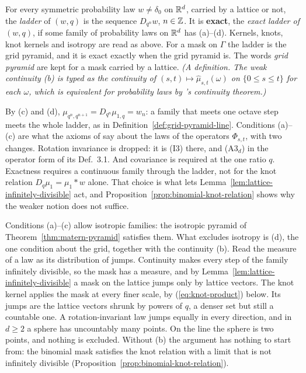 \begin{definition}[exact grid pyramid in $\RR^d$]
For every symmetric probability law $w \ne \delta_0$ on $\RR^d$, carried by a lattice or not, the
\emph{ladder} of $(w, q)$ is the sequence $D_{q^n}w$, $n \in \mathbb{Z}$. It is \textbf{exact}, the
\emph{exact ladder of $(w, q)$}, if some family of probability laws on $\RR^d$ has (a)--(d).
Kernels, knots, knot kernels and isotropy are read as above. For a mask on $\Gamma$ the ladder is
the grid pyramid, and it is exact exactly when the grid pyramid is. The words \emph{grid pyramid}
are kept for a mask carried by a lattice.
\statusT\quad\emph{(A definition. The weak continuity (b) is typed as the continuity of
$(s,t) \mapsto \widehat\mu_{s,t}(\omega)$ on $\{0 \le s \le t\}$ for each $\omega$, which is
equivalent for probability laws by \Levy{}'s continuity theorem.)}
\end{definition}

By (c) and (d), $\mu_{q^n, q^{n+1}} = D_{q^n}\mu_{1,q} = w_n$: a family that meets one octave step
meets the whole ladder, as in Definition~\ref{def:grid-pyramid-line}. Conditions (a)--(c) are what
the axioms of  say about the laws of the operators $\Phi_{s,t}$,
with two changes. Rotation invariance is dropped: it is (I3) there, and (A3$_d$) in the operator
form of its Def.~3.1. And covariance is required at the one ratio $q$. Exactness requires a continuous
family through the ladder, not for the knot relation $D_q\mu_1 = \mu_1 * w$ alone. That choice is
what lets Lemma~\ref{lem:lattice-infinitely-divisible} act, and
Proposition~\ref{prop:binomial-knot-relation} shows why the weaker notion does not suffice.

Conditions (a)--(c) allow isotropic families: the isotropic \Matern{} pyramid of
Theorem~\ref{thm:matern-pyramid} satisfies them. What excludes isotropy is (d), the one condition
about the grid, together with the continuity (b). Read the \Levy{} measure of a law as its
distribution of jumps. Continuity makes every step of the family infinitely divisible, so the mask
has a \Levy{} measure, and by Lemma~\ref{lem:lattice-infinitely-divisible} a mask on the lattice
jumps only by lattice vectors. The knot kernel applies the mask at every finer scale, by
(\ref{eq:knot-product}) below. Its jumps are the lattice vectors shrunk by powers of $q$, a denser
set but still a countable one. A rotation-invariant law jumps equally in every direction, and in
$d \ge 2$ a sphere has uncountably many points. On the line the sphere is two points, and nothing
is excluded. Without (b) the argument has nothing to start from: the binomial mask satisfies the
knot relation with a limit that is not infinitely divisible
(Proposition~\ref{prop:binomial-knot-relation}).

